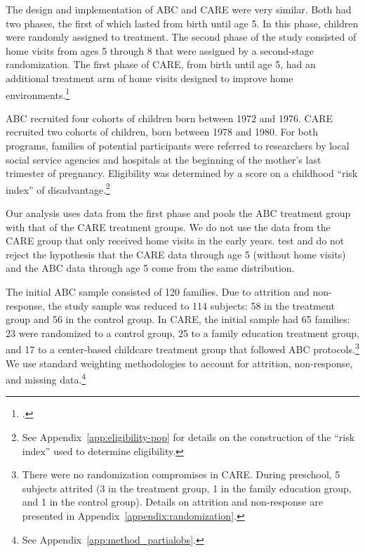 The design and implementation of ABC and CARE were very similar. Both had two phases, the first of which lasted from birth until age 5. In this phase, children were randomly assigned to treatment. The second phase of the study consisted of home visits from ages 5 through 8 that were assigned by a second-stage randomization. The first phase of CARE, from birth until age 5, had an additional treatment arm of home visits designed to improve home environments.\footnote{\citet{Wasik_Ramey_etal_1990_CD}.}

ABC recruited four cohorts of children born between 1972 and 1976. CARE recruited two cohorts of children, born between 1978 and 1980. For both programs, families of potential participants were referred to researchers by local social service agencies and hospitals at the beginning of the mother's last trimester of pregnancy. Eligibility was determined by a score on a childhood ``risk index'' of disadvantage.\footnote{See  Appendix~\ref{app:eligibility-pop} for details on the construction of the ``risk index'' used to determine eligibility.}

Our analysis uses data from the first phase and pools the ABC treatment group with that of the CARE treatment groups. We do not use the data from the CARE group that only received home visits in the early years. \cite{Campbell_Conti_etal_2014_EarlyChildhoodInvestments} test and do not reject the hypothesis that the CARE data through age 5 (without home visits) and the ABC data through age 5 come from the same distribution.

The initial ABC sample consisted of 120 families. Due to attrition and non-response, the study sample was reduced to 114 subjects: 58 in the treatment group and 56 in the control group. In CARE, the initial sample had 65 families: 23 were randomized to a control group, 25 to a family education treatment group, and 17 to a center-based childcare treatment group that followed ABC protocols.\footnote{There were no randomization compromises in CARE. During preschool, 5 subjects attrited (3 in the treatment group, 1 in the family education group, and 1 in the control group). Details on attrition and non-response are presented in Appendix~\ref{appendix:randomization}.} We use standard weighting methodologies to account for attrition, non-response, and missing data.\footnote{See Appendix~\ref{app:method_partialobs}.}

